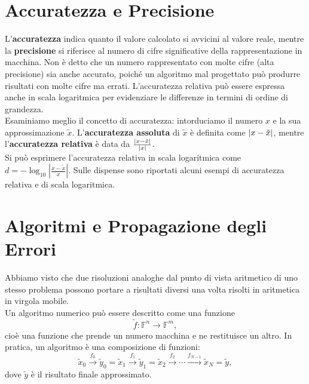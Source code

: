 \documentclass[letterpaper,12pt]{article}
\DeclarePairedDelimiter{\abs}{\lvert}{\rvert} %
\newcommand{\numberset}{\mathbb}
\newcommand{\F}{\numberset{F}}
\begin{document}
\section*{Accuratezza e Precisione}

L'\textbf{accuratezza} indica quanto il valore calcolato si avvicini al valore reale, mentre la \textbf{precisione} 
si riferisce al numero di cifre significative della rappresentazione in macchina. Non è detto che un numero rappresentato 
con molte cifre (alta precisione) sia anche accurato, poiché un algoritmo mal progettato può produrre risultati con molte 
cifre ma errati. L'accuratezza relativa può essere espressa anche in scala logaritmica per evidenziare le differenze 
in termini di ordine di grandezza. \\
Esaminiamo meglio il concetto di accuratezza: intorduciamo il numero $x$ e la sua approssimazione $\tilde{x}$. 
L'\textbf{accuratezza assoluta} di $\tilde{x}$ è definita come $\abs{x - \tilde{x}}$, mentre l'\textbf{accuratezza relativa}
è data da $\frac{\abs{x - \tilde{x}}}{\abs{x}}$. \\
Si può esprimere l'accuratezza relativa in scala logaritmica come $d = -\log_{10}\left|\frac{x - \tilde{x}}{x} \right|$.
Sulle dispense sono riportati alcuni esempi di accuratezza relativa e di scala logaritmica.

\section*{Algoritmi e Propagazione degli Errori}
Abbiamo visto che due risoluzioni analoghe dal punto di vista aritmetico di uno stesso problema possono portare a risultati
diversi una volta risolti in aritmetica in virgola mobile. \\

Un algoritmo numerico può essere descritto come una funzione
\[
\tilde{f} : \F^n \to \F^m,
\]
cioè una funzione che prende un numero macchina e ne restituisce un altro. In pratica, un algoritmo è una composizione di 
funzioni:
\[
\tilde{x}_0 \xrightarrow{f_0} \tilde{y}_0 = \tilde{x}_1 \xrightarrow{f_1} \tilde{y}_1 = \tilde{x}_2 \xrightarrow{f_2} \cdots \xrightarrow{f_{N-1}} \tilde{x}_N = \tilde{y},
\]
dove $\tilde{y}$ è il risultato finale approssimato.
\end{document}
